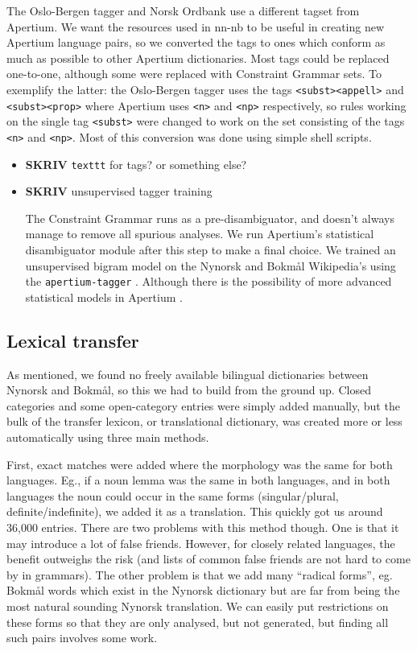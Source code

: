 \documentclass[11pt]{article}
\begin{document}
The Oslo-Bergen tagger and Norsk Ordbank use a different tagset from
Apertium. We want the resources used in nn-nb to be useful in creating
new Apertium language pairs, so we converted the tags to ones which
conform as much as possible to other Apertium dictionaries. Most tags
could be replaced one-to-one, although some were replaced with
Constraint Grammar sets. To exemplify the latter: the Oslo-Bergen
tagger uses the tags \texttt{<subst><appell>} and \texttt{<subst><prop>} where
Apertium uses \texttt{<n>} and \texttt{<np>} respectively, so rules working on the
single tag \texttt{<subst>} were changed to work on the set consisting of the
tags \texttt{<n>} and \texttt{<np>}. Most of this conversion was done using simple
shell scripts.
\begin{itemize}

\item \textbf{SKRIV} \texttt{texttt} for tags? or something else?\\
\label{sec-3.3.1}


\item \textbf{SKRIV} unsupervised tagger training\\
\label{sec-3.3.2}

The Constraint Grammar runs as a pre-disambiguator, and doesn't always
manage to remove all spurious analyses. We run Apertium's statistical
disambiguator module after this step to make a final choice. We
trained an unsupervised bigram model on the Nynorsk and Bokmål
Wikipedia's using the \texttt{apertium-tagger} \citep{todo}. Although there
is the possibility of more advanced statistical models in Apertium
\citep{sanchez2008utl,sheikh2009unpublished}.

\end{itemize} %
\subsection{Lexical transfer}
\label{sec-3.4}

As mentioned, we found no freely available bilingual dictionaries
between Nynorsk and Bokmål, so this we had to build from the ground
up. Closed categories and some open-category entries were simply added
manually, but the bulk of the transfer lexicon, or translational
dictionary, was created more or less automatically using three main
methods.

First, exact matches were added where the morphology was the same for
both languages. Eg., if a noun lemma was the same in both languages,
and in both languages the noun could occur in the same forms
(singular/plural, definite/indefinite), we added it as a
translation. This quickly got us around 36,000 entries. There are two
problems with this method though. One is that it may introduce a lot
of false friends. However, for closely related languages, the benefit
outweighs the risk (and lists of common false friends are not hard to
come by in grammars). The other problem is that we add many ``radical
forms'', eg. Bokmål words which exist in the Nynorsk dictionary but are
far from being the most natural sounding Nynorsk translation. We can
easily put restrictions on these forms so that they are only analysed,
but not generated, but finding all such pairs involves some work.
\end{document}
